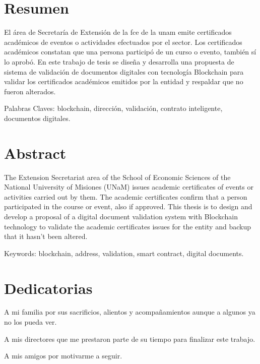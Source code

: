 \section*{Resumen}
El área de Secretaría de Extensión de la \gls{fce} de la \gls{unam} emite certificados
académicos de eventos o actividades efectuados por el sector. Los certificados académicos 
constatan que una persona participó de un curso o evento, también sí lo aprobó.
 En este trabajo de tesis se diseña y desarrolla una propuesta de sistema de validación de documentos digitales  con tecnología Blockchain 
para validar los certificados académicos emitidos por la entidad y respaldar que no fueron alterados. 

Palabras Claves: blockchain, dirección, validación, contrato inteligente, documentos digitales.




\section*{Abstract}

The Extension Secretariat area of the School of Economic Sciences of the National University of Misiones (UNaM) issues academic certificates of events or activities carried out by them. The academic certificates confirm that a person participated in the course or event, also if approved. 
This thesis is to design and develop a  proposal of a  digital document validation system with Blockchain technology to validate the academic certificates issues for the entity and backup that it hasn't been altered.

Keywords: blockchain, address, validation, smart contract,  digital documents.


\newpage
\section*{Dedicatorias}

A mi familia por sus sacrificios, alientos  y acompañamientos aunque a algunos ya no los pueda ver.

A mis directores que me prestaron parte de su tiempo para finalizar este trabajo.

A mis amigos por motivarme a seguir.




